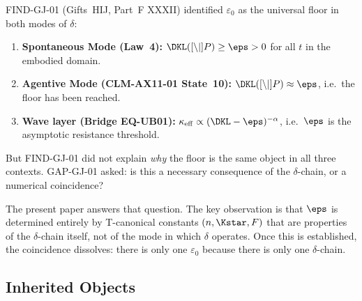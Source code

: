 \documentclass[12pt, a4paper]{article}
\begin{document}

\begin{keybox}[title={What GAP-GJ-01 Asked}]
FIND-GJ-01 (Gifts~HIJ, Part~F XXXII) identified $\varepsilon_0$
as the universal floor in both modes of $\delta$:
\begin{enumerate}[leftmargin=*, noitemsep, itemsep=2pt]
\item \textbf{Spontaneous Mode (Law~4):}
  $\DKL(\Cref\|P) \geq \eps > 0$ for all $t$ in the
  embodied domain.
\item \textbf{Agentive Mode (CLM-AX11-01 State~10):}
  $\DKL(\Cref\|P) \approx \eps$, i.e.\ the floor has been reached.
\item \textbf{Wave layer (Bridge EQ-UB01):}
  $\kappa_{\mathrm{eff}} \propto (\DKL - \eps)^{-\alpha}$,
  i.e.\ $\eps$ is the asymptotic resistance threshold.
\end{enumerate}
But FIND-GJ-01 did not explain \emph{why} the floor is the same
object in all three contexts. GAP-GJ-01 asked: is this a
necessary consequence of the $\delta$-chain, or a numerical
coincidence?
\end{keybox}

\bigskip
\noindent The present paper answers that question.
The key observation is that $\eps$ is determined entirely by
T-canonical constants $(n, \Kstar, F)$ that are properties of
the $\delta$-chain itself, not of the mode in which $\delta$
operates. Once this is established, the coincidence dissolves:
there is only one $\varepsilon_0$ because there is only one
$\delta$-chain.

\subsection{Inherited Objects}

\end{document}
